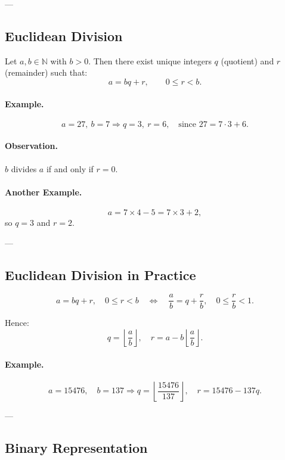 ---

\subsection{Euclidean Division}

\begin{proposition}
Let \( a, b \in \mathbb{N} \) with \( b > 0 \).  
Then there exist unique integers \( q \) (quotient) and \( r \) (remainder) such that:
\[
a = bq + r, \qquad 0 \leq r < b.
\]
\end{proposition}

\paragraph{Example.}
\[
a = 27, \ b = 7 \Rightarrow q = 3, \ r = 6, \quad \text{since } 27 = 7 \cdot 3 + 6.
\]

\paragraph{Observation.}
\(b\) divides \(a\) if and only if \(r = 0\).

\paragraph{Another Example.}
\[
a = 7 \times 4 - 5 = 7 \times 3 + 2,
\]
so \(q = 3\) and \(r = 2\).

---

\subsection{Euclidean Division in Practice}

\[
a = bq + r, \quad 0 \leq r < b
\quad \Longleftrightarrow \quad
\frac{a}{b} = q + \frac{r}{b}, \quad 0 \leq \frac{r}{b} < 1.
\]

Hence:
\[
q = \left\lfloor \frac{a}{b} \right\rfloor, \quad
r = a - b \left\lfloor \frac{a}{b} \right\rfloor.
\]

\paragraph{Example.}
\[
a = 15476, \quad b = 137 \Rightarrow
q = \left\lfloor \frac{15476}{137} \right\rfloor, \quad
r = 15476 - 137q.
\]

---

\subsection{Binary Representation}

